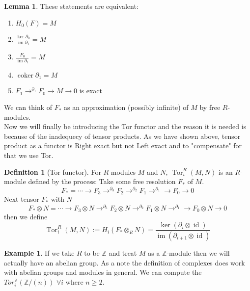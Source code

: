 \documentclass[11pt]{article}
\theoremstyle{definition}
\newtheorem{definition}{Definition}[section]
\newtheorem{example}{Example}[section]
\newtheorem{lemma}[theorem]{Lemma}
\DeclareMathOperator{\Ima}{im}
\DeclareMathOperator{\coker}{coker}
\DeclareMathOperator{\Tor}{Tor}
\DeclareMathOperator{\id}{id}
\newcommand{\Z}{\mathbb{Z}}
\begin{document}
\begin{lemma}
These statements are equivalent:
\begin{enumerate}
    \item $H_0(F)=M$
    \item $\frac{\ker\partial_0}{\Ima{\partial_1}}=M$
    \item $\frac{F_0}{\Ima{\partial_1}}=M$
    \item $\coker\partial_1 =M$
    \item $F_1\rightarrow^{\partial_1}F_0\rightarrow M\rightarrow 0$ is exact
\end{enumerate}
\end{lemma}
We can think of $F_{*}$ as an approximation (possibly infinite) of $M$ by free $R$-modules.\\ 

Now we will finally be introducing the Tor functor and the reason it is needed is because of the inadequecy of tensor products. As we have shown above, tensor product as a functor is Right exact but not Left exact and to "compensate" for that we use Tor.

\begin{definition}[Tor functor]
For $R$-modules $M$ and $N$, $\Tor_i^R(M,N)$ is an $R$-module defined by the process:
Take some free resolution $F_{*}$ of $M$. 
    $$F_{*}=\cdots\rightarrow F_3\rightarrow ^{\partial_3}F_2\rightarrow^{\partial_2}F_1\rightarrow^{\partial_1}\rightarrow F_0\rightarrow 0 $$
Next tensor $F_{*}$ with $N$
$$F_{*}\otimes N=\cdots\rightarrow F_3\otimes N\rightarrow ^{\partial_3}F_2 \otimes N\rightarrow^{\partial_2}F_1\otimes N\rightarrow^{\partial_1}\rightarrow F_0\otimes N\rightarrow 0 $$
then we define
    $$\Tor_i^R(M,N):=H_i(F_{*}\otimes_R N)=\frac{\ker(\partial_i\otimes \id)}{\Ima(\partial_{i+1}\otimes \id)}$$

\end{definition}

\begin{example}
If we take $R$ to be $\Z$ and treat $M$ as a $\Z$-module then we will actually have an abelian group. As a note the definition of complexes does work with abelian groups and modules in general. We can compute the $Tor_i^{\Z}(\Z/ (n))$ $\forall i$ where $n\geq 2$.



\end{example}
\end{document}
